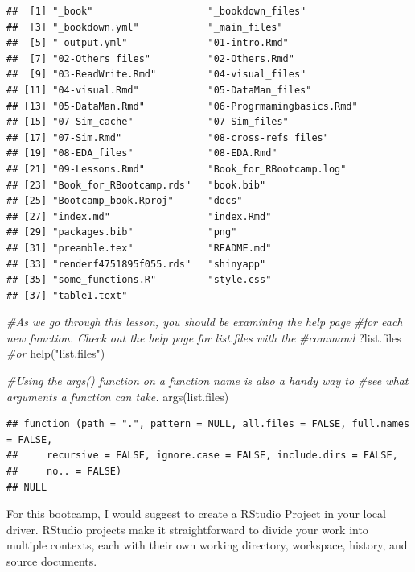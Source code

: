 \documentclass[
]{book}
\newenvironment{Shaded}{\begin{snugshade}}{\end{snugshade}}
\newcommand{\CommentTok}[1]{\textcolor[rgb]{0.56,0.35,0.01}{\textit{#1}}}
\newcommand{\FunctionTok}[1]{\textcolor[rgb]{0.00,0.00,0.00}{#1}}
\newcommand{\NormalTok}[1]{#1}
\newcommand{\StringTok}[1]{\textcolor[rgb]{0.31,0.60,0.02}{#1}}
\begin{document}
\begin{verbatim}
##  [1] "_book"                    "_bookdown_files"         
##  [3] "_bookdown.yml"            "_main_files"             
##  [5] "_output.yml"              "01-intro.Rmd"            
##  [7] "02-Others_files"          "02-Others.Rmd"           
##  [9] "03-ReadWrite.Rmd"         "04-visual_files"         
## [11] "04-visual.Rmd"            "05-DataMan_files"        
## [13] "05-DataMan.Rmd"           "06-Progrmamingbasics.Rmd"
## [15] "07-Sim_cache"             "07-Sim_files"            
## [17] "07-Sim.Rmd"               "08-cross-refs_files"     
## [19] "08-EDA_files"             "08-EDA.Rmd"              
## [21] "09-Lessons.Rmd"           "Book_for_RBootcamp.log"  
## [23] "Book_for_RBootcamp.rds"   "book.bib"                
## [25] "Bootcamp_book.Rproj"      "docs"                    
## [27] "index.md"                 "index.Rmd"               
## [29] "packages.bib"             "png"                     
## [31] "preamble.tex"             "README.md"               
## [33] "renderf4751895f055.rds"   "shinyapp"                
## [35] "some_functions.R"         "style.css"               
## [37] "table1.text"
\end{verbatim}

\begin{Shaded}
\begin{Highlighting}[]
\CommentTok{\#As we go through this lesson, you should be examining the help page }
\CommentTok{\#for each new function. Check out the help page for list.files with the}
\CommentTok{\#command}
\NormalTok{?list.files}
\CommentTok{\#or}
\FunctionTok{help}\NormalTok{(}\StringTok{"list.files"}\NormalTok{)}

\CommentTok{\#Using the args() function on a function name is also a handy way to }
\CommentTok{\#see what arguments a function can take.}
\FunctionTok{args}\NormalTok{(list.files)}
\end{Highlighting}
\end{Shaded}

\begin{verbatim}
## function (path = ".", pattern = NULL, all.files = FALSE, full.names = FALSE, 
##     recursive = FALSE, ignore.case = FALSE, include.dirs = FALSE, 
##     no.. = FALSE) 
## NULL
\end{verbatim}

For this bootcamp, I would suggest to create a RStudio Project in your local driver. RStudio projects make it straightforward to divide your work into multiple contexts, each with their own working directory, workspace, history, and source documents.
\end{document}
